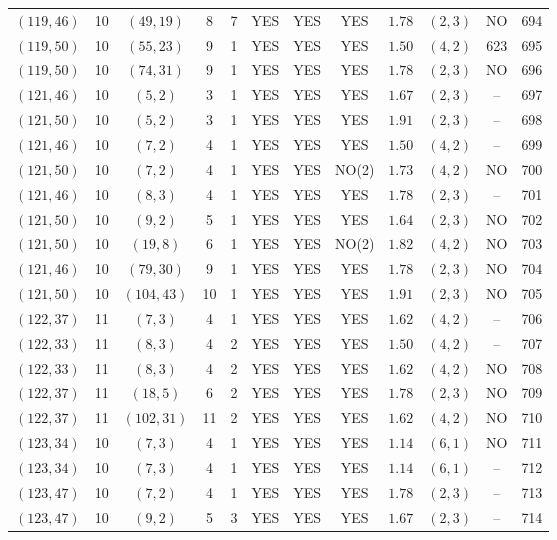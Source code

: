 \begin{longtable}{|c|c|c|c|c|c|c|c|c|c|c|c|}
$(119,46)$ & 10 & $(49,19)$ & 8 & 7 & YES & YES & YES & $1.78$ & $(2,3)$ & NO & 694\\
$(119,50)$ & 10 & $(55,23)$ & 9 & 1 & YES & YES & YES & $1.50$ & $(4,2)$ & 623 & 695\\
$(119,50)$ & 10 & $(74,31)$ & 9 & 1 & YES & YES & YES & $1.78$ & $(2,3)$ & NO & 696\\
$(121,46)$ & 10 & $(5,2)$ & 3 & 1 & YES & YES & YES & $1.67$ & $(2,3)$ & -- & 697\\
$(121,50)$ & 10 & $(5,2)$ & 3 & 1 & YES & YES & YES & $1.91$ & $(2,3)$ & -- & 698\\
$(121,46)$ & 10 & $(7,2)$ & 4 & 1 & YES & YES & YES & $1.50$ & $(4,2)$ & -- & 699\\
$(121,50)$ & 10 & $(7,2)$ & 4 & 1 & YES & YES & NO(2) & $1.73$ & $(4,2)$ & NO & 700\\
$(121,46)$ & 10 & $(8,3)$ & 4 & 1 & YES & YES & YES & $1.78$ & $(2,3)$ & -- & 701\\
$(121,50)$ & 10 & $(9,2)$ & 5 & 1 & YES & YES & YES & $1.64$ & $(2,3)$ & NO & 702\\
$(121,50)$ & 10 & $(19,8)$ & 6 & 1 & YES & YES & NO(2) & $1.82$ & $(4,2)$ & NO & 703\\
$(121,46)$ & 10 & $(79,30)$ & 9 & 1 & YES & YES & YES & $1.78$ & $(2,3)$ & NO & 704\\
$(121,50)$ & 10 & $(104,43)$ & 10 & 1 & YES & YES & YES & $1.91$ & $(2,3)$ & NO & 705\\
$(122,37)$ & 11 & $(7,3)$ & 4 & 1 & YES & YES & YES & $1.62$ & $(4,2)$ & -- & 706\\
$(122,33)$ & 11 & $(8,3)$ & 4 & 2 & YES & YES & YES & $1.50$ & $(4,2)$ & -- & 707\\
$(122,33)$ & 11 & $(8,3)$ & 4 & 2 & YES & YES & YES & $1.62$ & $(4,2)$ & NO & 708\\
$(122,37)$ & 11 & $(18,5)$ & 6 & 2 & YES & YES & YES & $1.78$ & $(2,3)$ & NO & 709\\
$(122,37)$ & 11 & $(102,31)$ & 11 & 2 & YES & YES & YES & $1.62$ & $(4,2)$ & NO & 710\\
$(123,34)$ & 10 & $(7,3)$ & 4 & 1 & YES & YES & YES & $1.14$ & $(6,1)$ & NO & 711\\
$(123,34)$ & 10 & $(7,3)$ & 4 & 1 & YES & YES & YES & $1.14$ & $(6,1)$ & -- & 712\\
$(123,47)$ & 10 & $(7,2)$ & 4 & 1 & YES & YES & YES & $1.78$ & $(2,3)$ & -- & 713\\
$(123,47)$ & 10 & $(9,2)$ & 5 & 3 & YES & YES & YES & $1.67$ & $(2,3)$ & -- & 714\\

\end{longtable}
